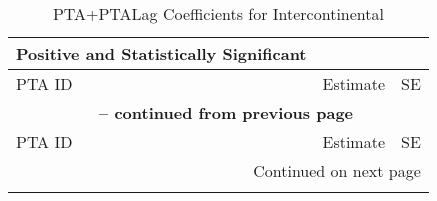\begin{center}
\small
\begin{longtable}{lcc}
    \caption{PTA+PTALag Coefficients for Intercontinental} \label{tab:pta_intercontinental} \\
    
    \hline
    \textbf{Positive and Statistically Significant} &  &  \\
    \hline
    PTA ID & Estimate & SE \\
    \hline
    \endfirsthead
    
    \multicolumn{3}{c}{{\bfseries \tablename\ \thetable{} -- continued from previous page}} \\
    \hline
    PTA ID & Estimate & SE \\
    \hline
    \endhead
    
    \hline \multicolumn{3}{r}{{Continued on next page}} \\ \hline
    \endfoot
    
    \hline
    \endlastfoot
    

\end{longtable}
\end{center}
